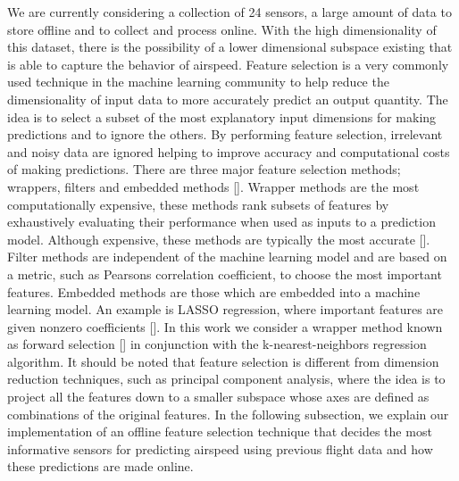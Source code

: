 \documentclass[]{aiaa-tc}
\begin{document}
We are currently considering a collection of 24 sensors, a large amount of data to store offline and to collect and process online. With the high dimensionality of this dataset, there is the possibility of a lower dimensional subspace existing that is able to capture the behavior of airspeed. Feature selection is a very commonly used technique in the machine learning community to help reduce the dimensionality of input data to more accurately predict an output quantity. The idea is to select a subset of the most explanatory input dimensions for making predictions and to ignore the others. By performing feature selection, irrelevant and noisy data are ignored helping to improve accuracy and computational costs of making predictions. There are three major feature selection methods; wrappers, filters and embedded methods []. Wrapper methods are the most computationally expensive, these methods rank subsets of features by exhaustively evaluating their performance when used as inputs to a prediction model. Although expensive, these methods are typically the most accurate []. Filter methods are independent of the machine learning model and are based on a metric, such as Pearsons correlation coefficient, to choose the most important features. Embedded methods are those which are embedded into a machine learning model. An example is LASSO regression, where important features are given nonzero coefficients []. In this work we consider a wrapper method known as forward selection [] in conjunction with the k-nearest-neighbors regression algorithm. It should be noted that feature selection is different from dimension reduction techniques, such as principal component analysis, where the idea is to project all the features down to a smaller subspace whose axes are defined as combinations of the original features. In the following subsection, we explain our implementation of an offline feature selection technique that decides the most informative sensors for predicting airspeed using previous flight data and how these predictions are made online. 
\end{document}
